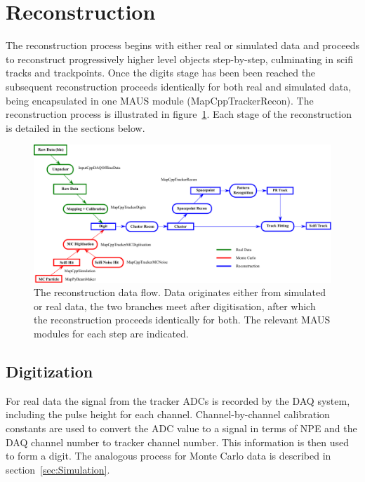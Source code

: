 \section{Reconstruction}
\label{sec:Reconstruction}
The reconstruction process begins with either real or simulated data and proceeds to reconstruct progressively higher level objects step-by-step, culminating in scifi tracks and trackpoints. Once the digits stage has been been reached the subsequent reconstruction proceeds identically for both real and simulated data, being encapsulated in one MAUS module (MapCppTrackerRecon). The reconstruction process is illustrated in figure~\ref{fig:DataFlow}. Each stage of the reconstruction is detailed in the sections below.

\begin{figure}[tbh]
  \begin{center}
    \includegraphics[width=0.95\linewidth]{07-Reconstruction/DataFlow2014.pdf}
    \caption{\label{fig:DataFlow} The reconstruction data flow. Data originates either from simulated or real data, the two branches meet after digitisation, after which the reconstruction proceeds identically for both.  The relevant MAUS modules for each step are indicated.}
  \end{center}
\end{figure}

  \subsection{Digitization}
  \label{subsec:Digitization}
  For real data the signal from the tracker ADCs is recorded by the DAQ system, including the pulse height for each channel.  Channel-by-channel calibration constants are used to convert the ADC value to a signal in terms of NPE and the DAQ channel number to tracker channel number.  This information is then used to form a digit.  The analogous process for Monte Carlo data is described in section~\ref{sec:Simulation}.

